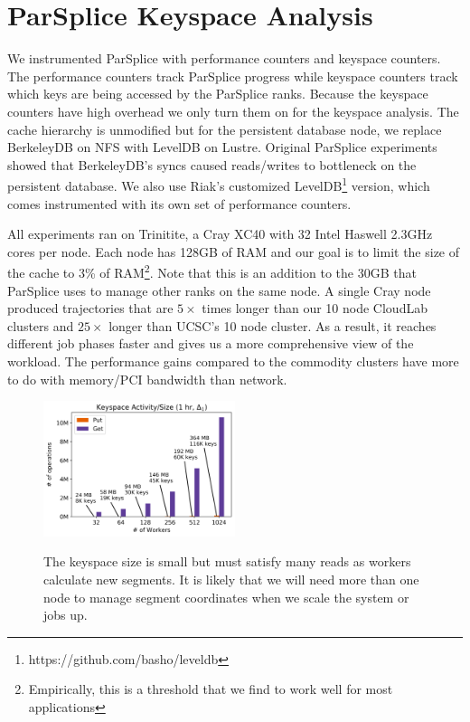 \section{ParSplice Keyspace Analysis}
\label{sec:parsplice-keyspace-analysis}

We instrumented ParSplice with performance counters and keyspace counters.  The
performance counters track ParSplice progress while keyspace counters track
which keys are being accessed by the ParSplice ranks. Because the keyspace
counters have high overhead we only turn them on for the keyspace analysis.
The cache hierarchy is unmodified but for the persistent database node, we
replace BerkeleyDB on NFS with LevelDB on Lustre. Original ParSplice
experiments showed that BerkeleyDB's syncs caused reads/writes to bottleneck on
the persistent database. We also use Riak's customized
LevelDB\footnote{https://github.com/basho/leveldb} version, which comes
instrumented with its own set of performance counters.

All experiments ran on Trinitite, a Cray XC40 with 32 Intel Haswell 2.3GHz
cores per node.  Each node has 128GB of RAM and our goal is to limit the size
of the cache to 3\% of RAM\footnote{Empirically, this is a threshold that we
find to work well for most applications}. Note that this is an addition to the
30GB that ParSplice uses to manage other ranks on the same node.  A single Cray
node produced trajectories that are \(5\times\) times longer than our 10 node
CloudLab clusters and \(25\times\) longer than UCSC's 10 node cluster. As
a result, it reaches different job phases faster and gives us a more
comprehensive view of the workload. The performance gains compared to the
commodity clusters have more to do with memory/PCI bandwidth than network.

\begin{figure}[t]
  \noindent\includegraphics[width=0.5\textwidth]{figures/methodology-keyspace.png}\\
  \caption{The keyspace size is small but must satisfy many reads as workers
  calculate new segments. It is likely that we will need
  more than one node to manage segment coordinates when we scale the system or jobs up.
  \label{fig:methodology-keyspace}}
\end{figure}


